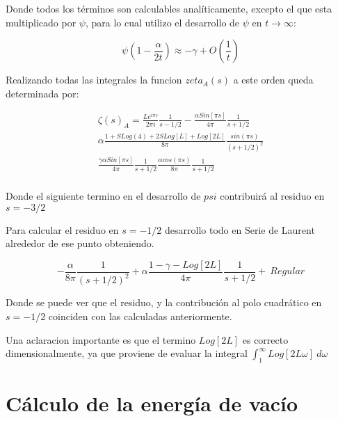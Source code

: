 Donde todos los términos son calculables analíticamente, excepto el que esta multiplicado por $\psi$, para lo cual utilizo el desarrollo de $\psi$ en $t \rightarrow \infty$:

\begin{equation}
    \psi(1-\frac{\alpha}{2 t}) \approx 
    -\gamma + O(\frac{1}{t})
\end{equation}

Realizando todas las integrales la funcion $zeta _A (s)$ a este orden queda determinada por:  

\begin{equation}
\begin{array}{c}
    \zeta (s) _{A} = 
    \frac{L e ^{i \pi s}}{2 \pi i} \frac{1}{s-1/2} 
    -\frac{\alpha Sin[\pi s]}{4 \pi} \frac{1}{s+1/2} \\
    \alpha 
    \frac{
    1+S Log(4)+2SLog[L]+Log[2L]
    }
    {8 \pi} \frac{sin(\pi s)}{(s+1/2) ^2}  \\
    \frac{\gamma \alpha Sin[\pi s]}{4 \pi } \frac{1}{s+1/2} 
    \frac{\alpha cos(\pi s) }{8 \pi}  \frac{1}{s+1/2}  \\
\end{array}
\end{equation}

Donde el siguiente termino en el desarrollo de $psi$ contribuirá al residuo en $s = -3/2$

Para calcular el residuo en $s=-1/2$ desarrollo todo en Serie de Laurent alrededor de ese punto obteniendo.

\begin{equation}
    - \frac{\alpha}{8 \pi} \frac{1}{(s+1/2)^2} + 
    \alpha \frac{1-\gamma -Log[2 L]}{4 \pi} \frac{1}{s+1/2} + \ Regular
\label{eq.desarrollo}
\end{equation}

Donde se puede ver que el residuo, y la contribución al polo cuadrático en $s=-1/2$ coinciden con las calculadas anteriormente.

Una aclaracion importante es que el termino $Log[2 L ]$ es correcto dimensionalmente, ya que proviene de evaluar la integral $\int _1 ^\infty
 Log[2 L \omega] \ d \omega$

\section{Cálculo de la energía de vacío}










